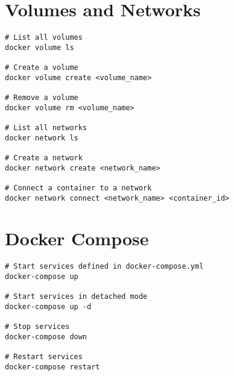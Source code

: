 \documentclass[11pt]{article}
\begin{document}
    \section*{Volumes and Networks}
    \begin{lstlisting}[style=dockerstyle]
# List all volumes
docker volume ls

# Create a volume
docker volume create <volume_name>

# Remove a volume
docker volume rm <volume_name>

# List all networks
docker network ls

# Create a network
docker network create <network_name>

# Connect a container to a network
docker network connect <network_name> <container_id>
    \end{lstlisting}

    \section*{Docker Compose}
    \begin{lstlisting}[style=dockerstyle]
# Start services defined in docker-compose.yml
docker-compose up

# Start services in detached mode
docker-compose up -d

# Stop services
docker-compose down

# Restart services
docker-compose restart
    \end{lstlisting}
\end{document}
